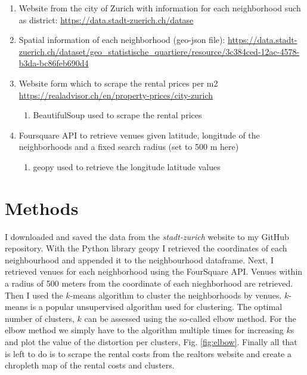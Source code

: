 \documentclass[a4paper,12pt,english]{article}
\begin{document}
\begin{enumerate}
    \item Website from the city of Zurich with information for each neighborhood such as district: \url{https://data.stadt-zuerich.ch/datase}
    \item Spatial information of each neighborhood (geo-json file): \url{https://data.stadt-zuerich.ch/dataset/geo_statistische_quartiere/resource/3c384ced-12ac-4578-b3da-bc86feb690d4}
    \item Website form which to scrape the rental prices per m2 \url{https://realadvisor.ch/en/property-prices/city-zurich}
    \begin{enumerate}
        \item BeautifulSoup used to scrape the rental prices
    \end{enumerate}
    \item Foursquare API to retrieve venues given latitude, longitude of the neighborhoods and a fixed search radius (set to 500 m here)
    \begin{enumerate}
        \item geopy used to retrieve the longitude latitude values
    \end{enumerate}
\end{enumerate}

\section{Methods}
I downloaded and saved the data from the \textit{stadt-zurich} website to my GitHub repository. With the Python library geopy I retrieved the coordinates of each neighbourhood and appended it to the neighbourhood dataframe. Next, I retrieved venues for each neighborhood using the FourSquare API. Venues within a radius of 500 meters from the coordinate of each nieghborhood are retrieved. Then I used the $k$-means algorithm to cluster the neighborhoods by venues. $k$-means is a popular unsupervised algorithm used for clustering. The optimal number of clusters, $k$ can be assessed using the so-called elbow method. For the elbow method we simply have to the algorithm multiple times for increasing $k$s and plot the value of the distortion per clusters, Fig. \ref{fig:elbow}. Finally all that is left to do is to scrape the rental costs from the realtors website and create a chropleth map of the rental costs and clusters.
\end{document}
